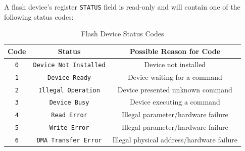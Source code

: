 \documentclass[12pt,a4paper,openright,twoside]{report}
\begin{document}
A flash device's register \texttt{STATUS} field is read-only and will contain one of the following status codes:
\begin{table}[h]
	\centering
	\begin{tabular}{c|c|c}
		Code       & Status                        & Possible Reason for Code                  \\  \hline\hline
		\texttt{0} & \texttt{Device Not Installed} & Device not installed                      \\ \hline
		\texttt{1} & \texttt{Device Ready}         & Device waiting for a command              \\ \hline
		\texttt{2} & \texttt{Illegal Operation}    & Device presented unknown command          \\ \hline
		\texttt{3} & \texttt{Device Busy}          & Device executing a command                \\ \hline
		\texttt{4} & \texttt{Read Error}           & Illegal parameter/hardware failure        \\ \hline
		\texttt{5} & \texttt{Write Error}          & Illegal parameter/hardware failure        \\ \hline
		\texttt{6} & \texttt{DMA Transfer Error}   & Illegal physical address/hardware failure
	\end{tabular}
	\caption{Flash Device Status Codes}
\end{table}
\end{document}
